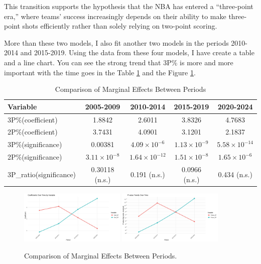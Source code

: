 \documentclass[11pt, a4paper]{article} %
\begin{document}
This transition supports the hypothesis that the NBA has entered a ``three-point era,'' where teams' success increasingly depends on their ability to 
make three-point shots efficiently rather than solely relying on two-point scoring.

More than these two models, I also fit another two models in the periods 2010-2014 and 2015-2019. Using the data from these four models, I have create a 
table and a line chart. You can see the strong trend that 3P\% is more and more important with the time goes in the Table \ref{tab:coefficients_comparison} 
and the Figure \ref{fig:coefficients_comparison}.
\vspace{0.5cm}

\begin{table}[h]
\centering
\begin{tabular}{lcccc}
\hline
\textbf{Variable} & \textbf{2005-2009} & \textbf{2010-2014} & \textbf{2015-2019} & \textbf{2020-2024}  \\
\hline
3P\%(coefficient) & 1.8842 & 2.6011 & 3.8326  & 4.7683  \\
2P\%(coefficient) & 3.7431 & 4.0901 & 3.1201 & 2.1837  \\
3P\%(significance) & 0.00381 & $4.09 \times 10^{-6}$ & $1.13 \times 10^{-9}$ & $5.58 \times 10^{-14}$  \\
2P\%(significance) & $3.11 \times 10^{-8}$  & $1.64 \times 10^{-12}$ & $1.51 \times 10^{-8}$ & $1.65 \times 10^{-6}$  \\
3P\_ratio(significance) & 0.30118 (n.s.) & 0.191 (n.s.) & 0.0966 (n.s.) & 0.434 (n.s.)\\
\hline
\end{tabular}
\caption{Comparison of Marginal Effects Between Periods}
\label{tab:coefficients_comparison}
\end{table}
\begin{figure}[htbp]
    \centering
    \includegraphics[width=0.45\textwidth]{figure/Coefficients Over Time by Variable.jpg}
    \includegraphics[width=0.45\textwidth]{figure/P-value Trends Over Time.jpg}
    \caption{Comparison of Marginal Effects Between Periods.}
    \label{fig:coefficients_comparison}
\end{figure}
\end{document}

